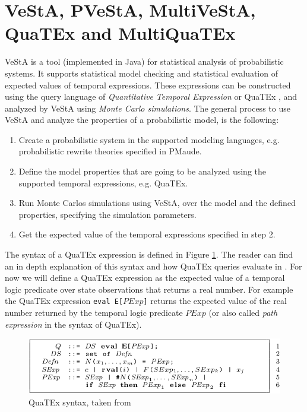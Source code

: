 \section{VeStA, PVeStA, MultiVeStA, QuaTEx and MultiQuaTEx}
VeStA \cite{Vesta} is a tool (implemented in Java) for statistical analysis of probabilistic systems. It supports statistical model checking and statistical evaluation of expected values of temporal expressions. These expressions can be constructed using the query language of  \textit{Quantitative Temporal Expression} or QuaTEx \cite{Agha2006}, and analyzed by VeStA using \textit{Monte Carlo simulations}. The general process to use VeStA and analyze the properties of a probabilistic model, is the following:
\begin{enumerate}
    \item Create a probabilistic system in the supported modeling languages, e.g. probabilistic rewrite theories specified in PMaude.
    \item Define the model properties that are going to be analyzed using the supported temporal expressions, e.g. QuaTEx.
    \item Run Monte Carlos simulations using VeStA, over the model and the defined properties, specifying the simulation parameters.
    \item Get the expected value of the temporal expressions specified in step 2.
\end{enumerate}
The syntax of a QuaTEx expression is defined in Figure \ref{fig:multivesta}. The reader can find an in depth explanation of this syntax and how QuaTEx queries evaluate in \cite{Agha2006,multivesta}. For now we will define a QuaTEx expression as the expected value of a temporal logic predicate over state observations that returns a real number. For example the QuaTEx expression \texttt{eval E[$PExp$]} returns the expected value of the real number returned by the temporal logic predicate $PExp$ (or also called \textit{path expression} in the syntax of QuaTEx).  
\begin{figure}[h]
    \centering
    \includegraphics[scale = 0.4]{images/quatex1.png}
    \caption{QuaTEx syntax, taken from \cite{multivesta}}
    \label{fig:multivesta}
\end{figure}

